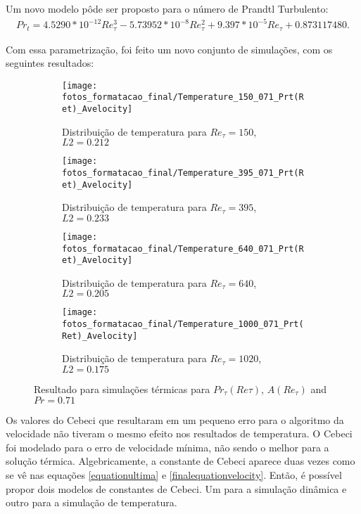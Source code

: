 Um novo modelo pôde ser proposto para o número de Prandtl Turbulento:
\vspace{-2mm}
\begin{equation}
\begin{split}
Pr_t = 4.5290 * 10^{-12} Re_\tau^3 - 5.73952 * 10^{-8} Re_\tau^2 + 9.397 * 10^{-5} Re_\tau + 0.873117480.
\end{split}
\end{equation}


Com essa parametrização, foi feito um novo conjunto de simulações, com os seguintes resultados:

\begin{figure*}[!h]
	\centering
	\begin{subfigure}[t]{0.5\textwidth}
		\centering
		\texttt{[image: fotos\_formatacao\_final/Temperature\_150\_071\_Prt(Ret)\_Avelocity]}
		\caption{Distribuição de temperatura para $Re_\tau = 150$, $L2 = 0.212$}
	\end{subfigure}
	\begin{subfigure}[t]{0.45\textwidth}
		\centering
		\texttt{[image: fotos\_formatacao\_final/Temperature\_395\_071\_Prt(Ret)\_Avelocity]}
		\caption{Distribuição de temperatura para $Re_\tau = 395$, $L2 = 0.233$}
	\end{subfigure}
	\begin{subfigure}[t]{0.5\textwidth}
		\centering
		\texttt{[image: fotos\_formatacao\_final/Temperature\_640\_071\_Prt(Ret)\_Avelocity]}
		\caption{Distribuição de temperatura para $Re_\tau = 640$, $L2 = 0.205$}
	\end{subfigure}
	\begin{subfigure}[t]{0.45\textwidth}
		\centering
		\texttt{[image: fotos\_formatacao\_final/Temperature\_1000\_071\_Prt(Ret)\_Avelocity]}
		\caption{Distribuição de temperatura para $Re_\tau = 1020$, $L2 = 0.175$}
	\end{subfigure}	
	\caption{Resultado para simulações térmicas para $Pr_\tau(Re\tau)$, $A(Re_\tau)$ and $Pr =0.71$ }
\end{figure*}

Os valores do Cebeci que resultaram em um pequeno erro para o algoritmo da velocidade não tiveram o mesmo efeito nos resultados de temperatura. O Cebeci foi modelado para o erro de velocidade mínima, não sendo o melhor para a solução térmica. Algebricamente, a constante de Cebeci aparece duas vezes como se vê nas equações \ref{equationultima} e \ref{finalequationvelocity}. Então, é possível propor dois modelos de constantes de Cebeci. Um para a simulação dinâmica e outro para a simulação de temperatura.    


